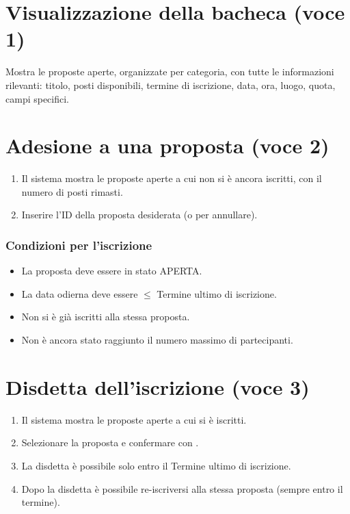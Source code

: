 \documentclass[12pt,a4paper,oneside]{report}
\newcommand{\tasto}[1]{\fbox{\small\ttfamily#1}}
\begin{document}
\section{Visualizzazione della bacheca (voce 1)}
Mostra le proposte aperte, organizzate per categoria, con tutte le informazioni rilevanti: titolo, posti disponibili, termine di iscrizione, data, ora, luogo, quota, campi specifici.

\section{Adesione a una proposta (voce 2)}

\begin{enumerate}
  \item Il sistema mostra le proposte aperte a cui non si è ancora iscritti, con il numero di posti rimasti.
  \item Inserire l'ID della proposta desiderata (o \tasto{0} per annullare).
\end{enumerate}

\subsubsection{Condizioni per l'iscrizione}
\begin{itemize}
  \item La proposta deve essere in stato APERTA.
  \item La data odierna deve essere $\leq$ Termine ultimo di iscrizione.
  \item Non si è già iscritti alla stessa proposta.
  \item Non è ancora stato raggiunto il numero massimo di partecipanti.
\end{itemize}

\section{Disdetta dell'iscrizione (voce 3)}

\begin{enumerate}
  \item Il sistema mostra le proposte aperte a cui si è iscritti.
  \item Selezionare la proposta e confermare con \tasto{s}.
  \item La disdetta è possibile solo entro il Termine ultimo di iscrizione.
  \item Dopo la disdetta è possibile re-iscriversi alla stessa proposta (sempre entro il termine).
\end{enumerate}
\end{document}
